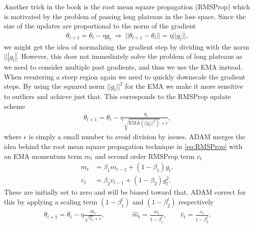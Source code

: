 Another trick in the book is the root mean square propagation (RMSProp) which is motivated by the problem of passing long plateaus in the loss space. Since the size of the updates are proportional to the norm of the gradient
\begin{align*}
  \theta_{t+1} = \theta_t - \eta g_t \ \Longrightarrow \ ||\theta_{t+1}-\theta_{t}|| = \eta ||g_t||,
\end{align*}
we might get the idea of normalizing the gradient step by dividing with the norm $|||g_t|$.  However, this does not immediately solve the problem of long plateaus as we need to consider multiple past gradients, and thus we use the EMA instead. When reentering a steep region again we need to quickly downscale the gradient steps. By using the squared norm $||g_t||^2$ for the EMA we make it more sensitive to outliers and achieve just that. This corresponds to the RMSProp update scheme
\begin{align}
  \theta_{t+1} = \theta_t - \eta \frac{g_t}{\sqrt{\text{EMA}(||g_t||^2)} + \epsilon},
  \label{eq:RMSProp}
\end{align}
where $\epsilon$ is simply a small number to avoid division by issues. ADAM merges the idea behind the root mean square propagation technique in \cref{eq:RMSProp} with an EMA momentum term $m_t$ and second order RMSProp term $v_t$ 
\begin{align*}
  m_t &= \beta_1 m_{t-1} + (1-\beta_1)g_t, \\
  v_t &= \beta_2 v_{t-1} + (1-\beta_2)g_t^2. 
\end{align*}
These are initially set to zero and will be biased toward that. ADAM correct for this by applying a scaling term $(1-\beta^t_1)$ and $(1-\beta^t_2)$ respectively
\begin{align}
  \theta_{t+1} = \theta_t - \eta \frac{\hat{m}_t}{\sqrt{\hat{v}_t} + \epsilon}, \qquad \qquad \hat{m}_t = \frac{m_t}{1-\beta^t_1}, \qquad \hat{v}_t = \frac{v_t}{1-\beta^t_2}. \\
  \label{eq:ADAM}
\end{align}


